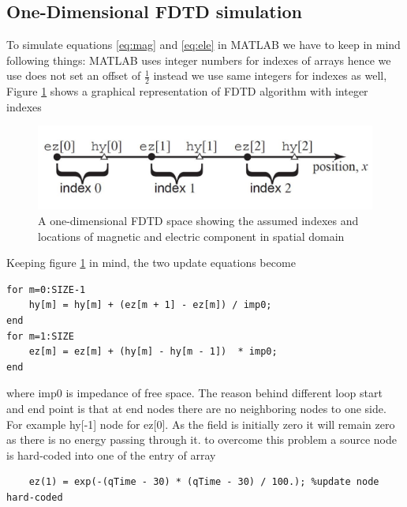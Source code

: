 \subsection{One-Dimensional FDTD simulation}
To simulate  equations \eqref{eq:mag} and \eqref{eq:ele} in MATLAB we have to keep in mind following things:
MATLAB uses integer numbers for indexes of arrays hence we use does not set an offset of $\frac{1}{2}$ instead we use same integers for indexes as well, Figure \ref{fig:fdtdpc} shows a graphical representation of FDTD algorithm with integer indexes
\begin{figure}[htbp]
	\centering
		\includegraphics[width=5in]{Pictures/fdtdpc.jpg}
	\caption[1 dimensional FDTD Space assumed with integer indices]{A one-dimensional FDTD space showing the assumed indexes and locations of magnetic and electric component in spatial domain}
	\label{fig:fdtdpc}
\end{figure}
Keeping figure \ref{fig:fdtdpc} in mind, the two update equations become
\begin{lstlisting}
for m=0:SIZE-1
	hy[m] = hy[m] + (ez[m + 1] - ez[m]) / imp0;
end
for m=1:SIZE
	ez[m] = ez[m] + (hy[m] - hy[m - 1])  * imp0;
end
\end{lstlisting}
where imp0 is impedance of free space.
The reason behind different loop start and end point is that at end nodes there are no neighboring nodes to one side. For example hy[-1] node for ez[0].
As the field is initially zero it will remain zero as there is no energy passing through it. to overcome this problem a source node is hard-coded into one of the entry of array 
\begin{lstlisting}
	ez(1) = exp(-(qTime - 30) * (qTime - 30) / 100.); %update node hard-coded
\end{lstlisting}

